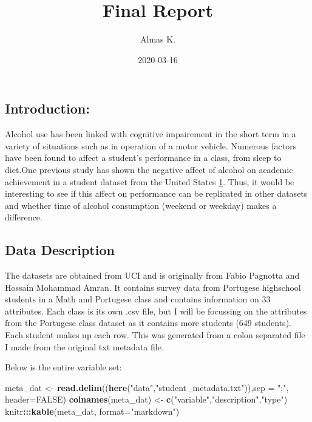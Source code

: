 \documentclass[]{article}
\title{Final Report}
\author{Almas K.}
\date{2020-03-16}
\newenvironment{Shaded}{\begin{snugshade}}{\end{snugshade}}
\newcommand{\DataTypeTok}[1]{\textcolor[rgb]{0.13,0.29,0.53}{#1}}
\newcommand{\KeywordTok}[1]{\textcolor[rgb]{0.13,0.29,0.53}{\textbf{#1}}}
\newcommand{\NormalTok}[1]{#1}
\newcommand{\OperatorTok}[1]{\textcolor[rgb]{0.81,0.36,0.00}{\textbf{#1}}}
\newcommand{\OtherTok}[1]{\textcolor[rgb]{0.56,0.35,0.01}{#1}}
\newcommand{\StringTok}[1]{\textcolor[rgb]{0.31,0.60,0.02}{#1}}
\begin{document}
\maketitle

\hypertarget{introduction}{%
\subsection{Introduction:}\label{introduction}}

Alcohol use has been linked with cognitive impairement in the short term
in a variety of situations such as in operation of a motor vehicle.
Numerous factors have been found to affect a student's performance in a
class, from sleep to diet.One previous study has shown the negative
affect of alcohol on academic achievement in a student dataset from the
United States
\href{https://www.ncbi.nlm.nih.gov/pmc/articles/PMC3026599/}{1}. Thus,
it would be interesting to see if this affect on performance can be
replicated in other datasets and whether time of alcohol consumption
(weekend or weekday) makes a difference.

\hypertarget{data-description}{%
\subsection{Data Description}\label{data-description}}

The datasets are obtained from UCI and is originally from Fabio Pagnotta
and Hossain Mohammad Amran. It contains survey data from Portugese
highschool students in a Math and Portugese class and contains
information on 33 attributes. Each class is its own .csv file, but I
will be focussing on the attributes from the Portugese class dataset as
it contains more students (649 students). Each student makes up each
row. This was generated from a colon separated file I made from the
original txt metadata file.

Below is the entire variable set:

\begin{Shaded}
\begin{Highlighting}[]
\NormalTok{meta_dat <-}\StringTok{ }\KeywordTok{read.delim}\NormalTok{((}\KeywordTok{here}\NormalTok{(}\StringTok{"data"}\NormalTok{,}\StringTok{"student_metadata.txt"}\NormalTok{)),}\DataTypeTok{sep =} \StringTok{";"}\NormalTok{, }\DataTypeTok{header=}\OtherTok{FALSE}\NormalTok{)}
\KeywordTok{colnames}\NormalTok{(meta_dat) <-}\StringTok{ }\KeywordTok{c}\NormalTok{(}\StringTok{"variable"}\NormalTok{,}\StringTok{"description"}\NormalTok{,}\StringTok{"type"}\NormalTok{)}
\NormalTok{knitr}\OperatorTok{:::}\KeywordTok{kable}\NormalTok{(meta_dat, }\DataTypeTok{format=}\StringTok{"markdown"}\NormalTok{)}
\end{Highlighting}
\end{Shaded}
\end{document}
